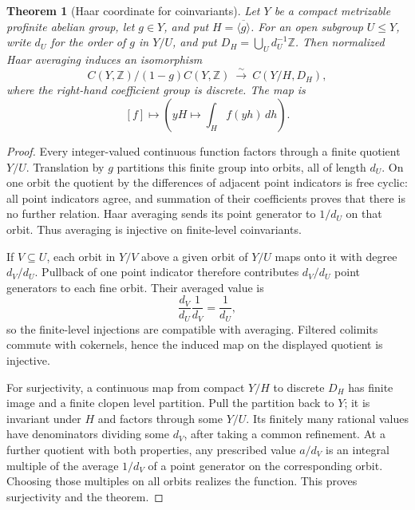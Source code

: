 \documentclass[11pt]{article}
\newcommand{\Z}{\mathbb Z}
\newtheorem{theorem}{Theorem}[section]
\theoremstyle{definition}
\theoremstyle{remark}
\begin{document}
\begin{theorem}[Haar coordinate for coinvariants]\label{thm:haar}
Let $Y$ be a compact metrizable profinite abelian group, let $g\in Y$, and put $H=\overline{\langle g\rangle}$. For an open subgroup $U\leq Y$, write $d_U$ for the order of $g$ in $Y/U$, and put $D_H=\bigcup_Ud_U^{-1}\Z$. Then normalized Haar averaging induces an isomorphism
\[
 C(Y,\Z)/(1-g)C(Y,\Z)\ \xrightarrow{\ \sim\ }\ C(Y/H,D_H),
\]
where the right-hand coefficient group is discrete. The map is
\[
 [f]\longmapsto\left(yH\longmapsto\int_H f(yh)\,dh\right).
\]
\end{theorem}
\begin{proof}
Every integer-valued continuous function factors through a finite quotient $Y/U$. Translation by $g$ partitions this finite group into orbits, all of length $d_U$. On one orbit the quotient by the differences of adjacent point indicators is free cyclic: all point indicators agree, and summation of their coefficients proves that there is no further relation. Haar averaging sends its point generator to $1/d_U$ on that orbit. Thus averaging is injective on finite-level coinvariants.

If $V\subseteq U$, each orbit in $Y/V$ above a given orbit of $Y/U$ maps onto it with degree $d_V/d_U$. Pullback of one point indicator therefore contributes $d_V/d_U$ point generators to each fine orbit. Their averaged value is
\[
 \frac{d_V}{d_U}\frac1{d_V}=\frac1{d_U},
\]
so the finite-level injections are compatible with averaging. Filtered colimits commute with cokernels, hence the induced map on the displayed quotient is injective.

For surjectivity, a continuous map from compact $Y/H$ to discrete $D_H$ has finite image and a finite clopen level partition. Pull the partition back to $Y$; it is invariant under $H$ and factors through some $Y/U$. Its finitely many rational values have denominators dividing some $d_V$, after taking a common refinement. At a further quotient with both properties, any prescribed value $a/d_V$ is an integral multiple of the average $1/d_V$ of a point generator on the corresponding orbit. Choosing those multiples on all orbits realizes the function. This proves surjectivity and the theorem.
\end{proof}
\end{document}
